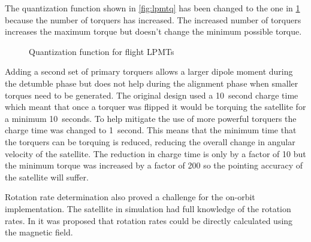 The  quantization function shown in \cref{fig:lpmtq} has been changed to the one in \cref{fig:lpmtq-flt} because the number of torquers has increased. The increased number of torquers increases the maximum torque but doesn't change the minimum possible torque.

\begin{figure}[htb!]
    \centering
    \caption{Quantization function for flight \acsp{LPMT}}
    \label{fig:lpmtq-flt}
\end{figure}

Adding a second set of primary torquers allows a larger dipole moment during the detumble phase but does not help during the alignment phase when smaller torques need to be generated. The original design used a 10~second charge time which meant that once a torquer was flipped it would be torquing the satellite for a minimum 10~seconds. To help mitigate the use of more powerful torquers the charge time was changed to 1~second. This means that the minimum time that the torquers can be torquing is reduced, reducing the overall change in angular velocity of the satellite. The reduction in charge time is only by a factor of 10 but the minimum torque was increased by a factor of 200 so the pointing accuracy of the satellite will suffer.

Rotation rate determination also proved a challenge for the on-orbit implementation. The satellite in simulation had full knowledge of the rotation rates. In \cite{Mentch11} it was proposed that rotation rates could be directly calculated using the magnetic field. 


